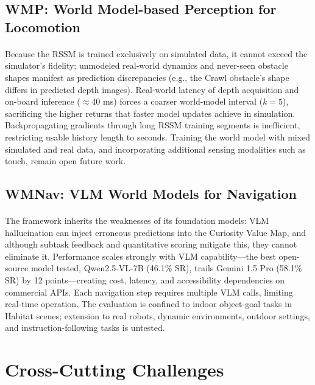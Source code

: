 \documentclass[12pt,a4paper,final]{extreport}
\begin{document}
\subsection{WMP: World Model-based Perception for Locomotion}

\paragraph{} Because the RSSM is trained exclusively on simulated data, it cannot exceed the simulator's fidelity; unmodeled real-world dynamics and never-seen obstacle shapes manifest as prediction discrepancies (e.g., the Crawl obstacle's shape differs in predicted depth images). Real-world latency of depth acquisition and on-board inference ($\approx$40 ms) forces a coarser world-model interval ($k=5$), sacrificing the higher returns that faster model updates achieve in simulation. Backpropagating gradients through long RSSM training segments is inefficient, restricting usable history length to seconds. Training the world model with mixed simulated and real data, and incorporating additional sensing modalities such as touch, remain open future work.

\subsection{WMNav: VLM World Models for Navigation}

\paragraph{} The framework inherits the weaknesses of its foundation models: VLM hallucination can inject erroneous predictions into the Curiosity Value Map, and although subtask feedback and quantitative scoring mitigate this, they cannot eliminate it. Performance scales strongly with VLM capability---the best open-source model tested, Qwen2.5-VL-7B (46.1\% SR), trails Gemini 1.5 Pro (58.1\% SR) by 12 points---creating cost, latency, and accessibility dependencies on commercial APIs. Each navigation step requires multiple VLM calls, limiting real-time operation. The evaluation is confined to indoor object-goal tasks in Habitat scenes; extension to real robots, dynamic environments, outdoor settings, and instruction-following tasks is untested.

\section{Cross-Cutting Challenges}
\end{document}
